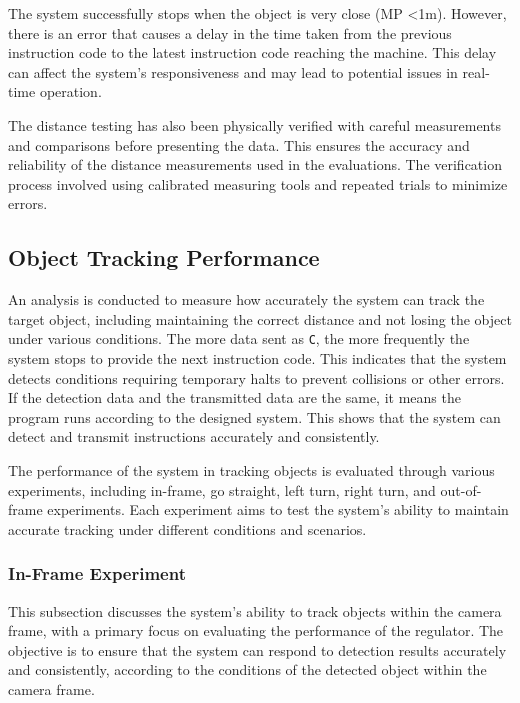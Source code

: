 The system successfully stops when the object is very close (MP \textless 1m). However, there is an error that causes a delay in the time taken from the previous instruction code to the latest instruction code reaching the machine. This delay can affect the system's responsiveness and may lead to potential issues in real-time operation.

The distance testing has also been physically verified with careful measurements and comparisons before presenting the data. This ensures the accuracy and reliability of the distance measurements used in the evaluations. The verification process involved using calibrated measuring tools and repeated trials to minimize errors.

\subsection{Object Tracking Performance}
\label{subsec:objecttrackingperformance}

An analysis is conducted to measure how accurately the system can track the target object, including maintaining the correct distance and not losing the object under various conditions.
The more data sent as \texttt{C}, the more frequently the system stops to provide the next instruction code. This indicates that the system detects conditions requiring temporary halts to prevent collisions or other errors.
If the detection data and the transmitted data are the same, it means the program runs according to the designed system. This shows that the system can detect and transmit instructions accurately and consistently.

The performance of the system in tracking objects is evaluated through various experiments, including in-frame, go straight, left turn, right turn, and out-of-frame experiments. Each experiment aims to test the system's ability to maintain accurate tracking under different conditions and scenarios.

\vspace{5pt}
\subsubsection{In-Frame Experiment}
\label{subsubsec:inframeexperiment}

This subsection discusses the system's ability to track objects within the camera frame, with a primary focus on evaluating the performance of the regulator. The objective is to ensure that the system can respond to detection results accurately and consistently, according to the conditions of the detected object within the camera frame.

